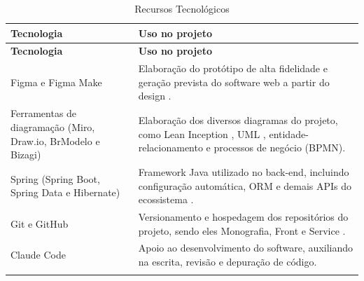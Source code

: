 \begin{center}
    \begin{longtable}{|>{\raggedright\arraybackslash}p{3.5cm}|p{11.5cm}|}
        \caption{Recursos Tecnológicos} \label{tab:tecnologias} \\
        \hline
        \textbf{Tecnologia} & \textbf{Uso no projeto} \\
        \hline
        \endfirsthead

        \hline
        \textbf{Tecnologia} & \textbf{Uso no projeto} \\
        \hline
        \endhead

        Figma e Figma Make & Elaboração do protótipo de alta fidelidade e geração prevista do software web a partir do design \cite{figma}. \\
        \hline
        Ferramentas de diagramação (Miro, Draw.io, BrModelo e Bizagi) & Elaboração dos diversos diagramas do projeto, como Lean Inception \cite{caroli2017lean}, UML \cite{drawio}, entidade-relacionamento e processos de negócio (BPMN). \\
        \hline
        Spring (Spring Boot, Spring Data e Hibernate) & Framework Java utilizado no back-end, incluindo configuração automática, ORM e demais APIs do ecossistema \cite{weissmann2014vire}. \\
        \hline
        Git e GitHub & Versionamento e hospedagem dos repositórios do projeto, sendo eles Monografia, Front e Service \cite{githubdocs}. \\
        \hline
        Claude Code & Apoio ao desenvolvimento do software, auxiliando na escrita, revisão e depuração de código. \\
        \hline

        \multicolumn{2}{c}{\small Fonte: autoria própria.} \\
    \end{longtable}
\end{center}